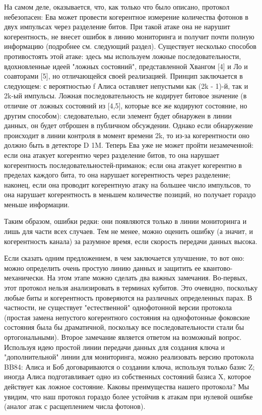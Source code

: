 На самом деле, оказывается, что, как только что было описано, протокол небезопасен: Ева может провести когерентное измерение количества фотонов в двух импульсах через разделение битов. При такой атаке она не нарушит когерентность, не внесет ошибок в линию мониторинга и получит почти полную информацию (подробнее см. следующий раздел). Существует несколько способов противостоять этой атаке: здесь мы используем ложные последовательности, вдохновленные идеей "ложных состояний", представленной Хвангом [4] и Ло и соавторами [5], но отличающейся своей реализацией. Принцип заключается в следующем: с вероятностью f Алиса оставляет непустыми как (2k - 1)-й, так и 2k-ый импульсы. Ложная последовательность не кодирует битовое значение (в отличие от ложных состояний из [4,5], которые все же кодируют состояние, но другим способом): следовательно, если элемент будет обнаружен в линии данных, он будет отброшен в публичном обсуждении. Однако если обнаружение происходит в линии контроля в момент времени 2k, то из-за когерентности оно должно быть в детекторе D 1M. Теперь Ева уже не может пройти незамеченной: если она атакует когерентно через разделение битов, то она нарушает когерентность последовательностей-приманок; если она атакует когерентно в пределах каждого бита, то она нарушает когерентность через разделение; наконец, если она проводит когерентную атаку на большее число импульсов, то она нарушает когерентность в меньшем количестве позиций, но получает гораздо меньше информации.

Таким образом, ошибки редки: они появляются только в линии мониторинга и лишь для части всех случаев. Тем не менее, можно оценить ошибку (а значит, и когерентность канала) за разумное время, если скорость передачи данных высока.

Если сказать одним предложением, в чем заключается улучшение, то вот оно: можно определить очень простую линию данных и защитить ее квантово-механически. На этом этапе можно сделать два важных замечания. Во-первых, этот протокол нельзя анализировать в терминах кубитов. Это очевидно, поскольку любые биты и когерентность проверяются на различных определенных парах. В частности, не существует "естественной" однофотонной версии протокола (простая замена непустого когерентного состояния на однофотонные фоковские состояния была бы драматичной, поскольку все последовательности стали бы ортогональными). Второе замечание является ответом на возможный вопрос. Используя идею простой линии передачи данных для создания ключа и "дополнительной" линии для мониторинга, можно реализовать версию протокола BB84: Алиса и Боб договариваются о создании ключа, используя только базис Z; иногда Алиса подготавливает одно из собственных состояний базиса X, которое действует как ложное состояние. Каковы преимущества нашего протокола? Мы увидим, что наш протокол гораздо более устойчив к атакам при нулевой ошибке (аналог атак с расщеплением числа фотонов).

